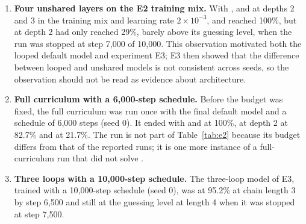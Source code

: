 \begin{enumerate}
\item \textbf{Four unshared layers on the E2 training mix.}
With ,  and  at depths 2 and 3 in the training mix and learning rate $2\times10^{-3}$,  and  reached 100\%, but  at depth 2 had only reached 29\%, barely above its guessing level, when the run was stopped at step 7{,}000 of 10{,}000.
This observation motivated both the looped default model and experiment E3; E3 then showed that the difference between looped and unshared models is not consistent across seeds, so the observation should not be read as evidence about architecture.
\item \textbf{Full curriculum with a 6{,}000-step schedule.}
Before the budget was fixed, the full curriculum was run once with the final default model and a schedule of 6{,}000 steps (seed 0).
It ended with  and  at 100\%,  at depth 2 at 82.7\% and  at 21.7\%.
The run is not part of Table~\ref{tab:e2} because its budget differs from that of the reported runs; it is one more instance of a full-curriculum run that did not solve .
\item \textbf{Three loops with a 10{,}000-step schedule.}
The three-loop model of E3, trained with a 10{,}000-step schedule (seed 0), was at 95.2\% at chain length 3 by step 6{,}500 and still at the guessing level at length 4 when it was stopped at step 7{,}500.
\end{enumerate}
